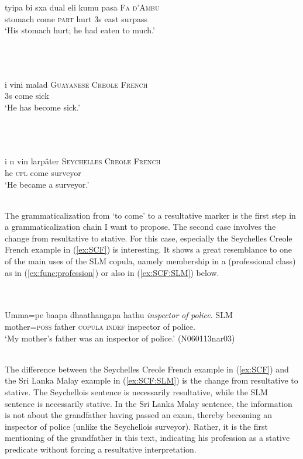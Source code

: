 \documentclass[a4paper,12pt]{article}
\newcommand{\xbox}[2]{\noindent\parbox[t]{#1}{#2}\noindent}
\newcommand{\xref}[1]{(\ref{#1})}
\newcommand{\ea}{\\\\}
\newcommand{\z}{\\\\}
\begin{document}
\xbox{\textwidth}{
\ea\label{ex:FdACP}
\gll tyipa bi sxa dual eli kumu pasa \textsc{Fa d'Ambu} \\
     stomach come \textsc{part} hurt 3s east surpass \\
`His stomach hurt; he had eaten to much.' \citep[159]{Post1992fadambu} 
\z
}
\xbox{\textwidth}{
\ea\label{ex:GCF}
\gll i vini malad \textsc{Guayanese Creole French}\\
     3s come sick \\
`He has become sick.' \citep[90]{Corne1971gcf}
\z
}

\xbox{\textwidth}{
\ea\label{ex:SCF}
\gll i n vin larpâter \textsc{Seychelles Creole French}\\
     he \textsc{cpl} come surveyor\\
`He became a surveyor.' \citep[80]{Corne1977scf}
\z
}

The grammaticalization from `to come' to a resultative marker is the first step in a grammaticalization chain I want to propose. The second case involves the change from resultative to stative. For this case, especially the Seychelles Creole French example in \xref{ex:SCF} is interesting. It shows a great resemblance to one of the main uses of the SLM copula, namely membership in a (professional class) as in \xref{ex:func:profession} or also in \xref{ex:SCF:SLM} below.

\xbox{\textwidth}{
\ea\label{ex:SCF:SLM}
\gll Umma=pe       baapa  dhaathangapa  hathu  {\em inspector}          {\em of} {\em police}. \textsc{SLM} \\
     mother=\textsc{poss} father \textsc{copula} \textsc{indef} inspector of police. \\
    `My mother's father was an inspector of police.' (N060113nar03)
\z
}

The difference between   the Seychelles Creole French example in \xref{ex:SCF} and the Sri Lanka Malay example in \xref{ex:SCF:SLM} is the change from resultative to stative. The Seychellois sentence is necessarily resultative, while the SLM sentence is necessarily stative. In the Sri Lanka Malay sentence, the information is not about the grandfather having passed an exam, thereby becoming an inspector of police (unlike the Seychellois surveyor). Rather, it is the first mentioning of the grandfather in this text, indicating his profession as a stative predicate without forcing a resultative interpretation.
\end{document}
